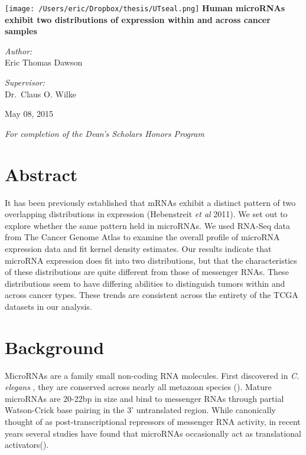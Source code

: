 \documentclass[12pt]{report}
\begin{document}
\begin{titlepage}
\begin{center}
 \texttt{[image: /Users/eric/Dropbox/thesis/UTseal.png]}
 \vfill
 \Huge \textbf{Human microRNAs exhibit two distributions of expression within and across cancer samples}
 \vfill
\noindent
\begin{minipage}[t]{0.4\textwidth}
\begin{flushleft} \large
\emph{Author:}\\
Eric Thomas Dawson
\end{flushleft}
\end{minipage}%
\begin{minipage}[t]{0.4\textwidth}
\begin{flushright} \large
\emph{Supervisor:} \\
Dr.~Claus O. Wilke
\end{flushright}
\end{minipage}
\vfill
\large May 08, 2015

\large \textit{For completion of the Dean's Scholars Honors Program}
\end{center}
\vfill

\vfill

\end{titlepage}





\section*{Abstract}
It has been previously established that mRNAs exhibit a distinct pattern of two overlapping distributions in expression (Hebenstreit \textit{et al} 2011).
We set out to explore whether the same pattern held in microRNAs.
We used RNA-Seq data from The Cancer Genome Atlas to examine the overall profile of microRNA expression data and fit kernel density estimates.
Our results indicate that microRNA expression does fit into two
distributions, but that the characteristics of these distributions are quite different from those of messenger RNAs. These distributions  seem to have differing abilities
to distinguish tumors within and across cancer types. These trends are consistent across the entirety of the TCGA datasets in our analysis.

\section*{Background}
MicroRNAs are a family small non-coding RNA molecules. First discovered in \emph{C. elegans} 
, they are conserved across nearly all metazoan species ().
Mature microRNAs are 20-22bp in size and bind to messenger RNAs through partial 
Watson-Crick base pairing in the 3' untranslated region. While canonically thought of as post-transcriptional 
repressors of messenger RNA activity, in recent years several studies have found 
that microRNAs occasionally act as translational activators().
\end{document}
